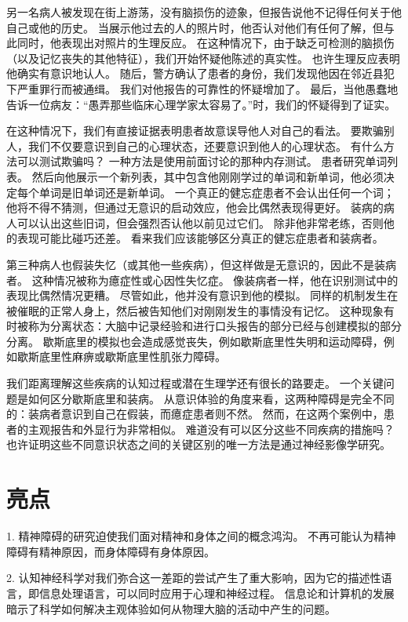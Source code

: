 另一名病人被发现在街上游荡，没有脑损伤的迹象，但报告说他不记得任何关于他自己或他的历史。 当展示他过去的人的照片时，他否认对他们有任何了解，但与此同时，他表现出对照片的生理反应。 在这种情况下，由于缺乏可检测的脑损伤（以及记忆丧失的其他特征），我们开始怀疑他陈述的真实性。 也许生理反应表明他确实有意识地认人。 随后，警方确认了患者的身份，我们发现他因在邻近县犯下严重罪行而被通缉。 我们对他报告的可靠性的怀疑增加了。 最后，当他愚蠢地告诉一位病友：“愚弄那些临床心理学家太容易了。”时，我们的怀疑得到了证实。

在这种情况下，我们有直接证据表明患者故意误导他人对自己的看法。 要欺骗别人，我们不仅要意识到自己的心理状态，还要意识到他人的心理状态。 有什么方法可以测试欺骗吗？ 一种方法是使用前面讨论的那种内存测试。 患者研究单词列表。 然后向他展示一个新列表，其中包含他刚刚学过的单词和新单词，他必须决定每个单词是旧单词还是新单词。 一个真正的健忘症患者不会认出任何一个词； 他将不得不猜测，但通过无意识的启动效应，他会比偶然表现得更好。 装病的病人可以认出这些旧词，但会强烈否认他以前见过它们。 除非他非常老练，否则他的表现可能比碰巧还差。 看来我们应该能够区分真正的健忘症患者和装病者。

第三种病人也假装失忆（或其他一些疾病），但这样做是无意识的，因此不是装病者。 这种情况被称为癔症性或心因性失忆症。 像装病者一样，他在识别测试中的表现比偶然情况更糟。 尽管如此，他并没有意识到他的模拟。 同样的机制发生在被催眠的正常人身上，然后被告知他们对刚刚发生的事情没有记忆。 这种现象有时被称为分离状态：大脑中记录经验和进行口头报告的部分已经与创建模拟的部分分离。 歇斯底里的模拟也会造成感觉丧失，例如歇斯底里性失明和运动障碍，例如歇斯底里性麻痹或歇斯底里性肌张力障碍。

我们距离理解这些疾病的认知过程或潜在生理学还有很长的路要走。 一个关键问题是如何区分歇斯底里和装病。 从意识体验的角度来看，这两种障碍是完全不同的：装病者意识到自己在假装，而癔症患者则不然。 然而，在这两个案例中，患者的主观报告和外显行为非常相似。 难道没有可以区分这些不同疾病的措施吗？ 也许证明这些不同意识状态之间的关键区别的唯一方法是通过神经影像学研究。

\section{亮点}

1. 精神障碍的研究迫使我们面对精神和身体之间的概念鸿沟。 不再可能认为精神障碍有精神原因，而身体障碍有身体原因。 

2. 认知神经科学对我们弥合这一差距的尝试产生了重大影响，因为它的描述性语言，即信息处理语言，可以同时应用于心理和神经过程。 信息论和计算机的发展暗示了科学如何解决主观体验如何从物理大脑的活动中产生的问题。 

